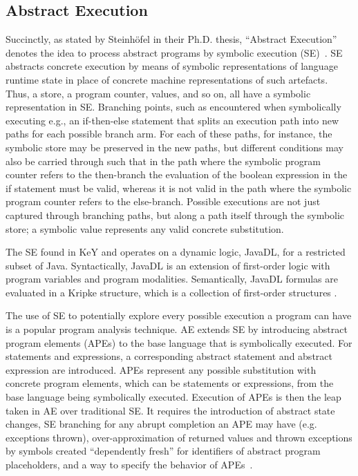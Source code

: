 \subsection{Abstract Execution}
Succinctly, as stated by Steinhöfel in their Ph.D. thesis, ``Abstract Execution'' denotes the idea to process abstract programs by symbolic execution (SE)~\cite{steinhoefel-20}.
SE~\cite{DBLP:journals/csur/BaldoniCDDF18,DBLP:journals/ac/YangFBCW19} abstracts concrete execution by means of symbolic representations of language runtime
state in place of concrete machine representations of such artefacts.
Thus, a store, a program counter, values, and so on, all have a symbolic representation in SE.
Branching points, such as encountered when symbolically executing e.g., an if-then-else statement that splits an execution path into new paths for each possible branch arm.
For each of these paths, for instance, the symbolic store may be preserved in the new paths, but different conditions may also be carried through such that in the path where the symbolic program counter refers
to the then-branch the evaluation of the boolean expression in the if statement must be valid, whereas it is not valid in the path where the symbolic program counter refers to the else-branch.
Possible executions are not just captured through branching paths, but along a path itself through the symbolic store; a symbolic value represents any valid concrete substitution.

The SE found in KeY and \Refinity{} operates on a dynamic logic, JavaDL, for a restricted subset of Java.
Syntactically, JavaDL is an extension of first-order logic with program variables and program modalities.
Semantically, JavaDL formulas are evaluated in a Kripke structure, which is a collection of first-order structures \cite[Sec.~3.3]{DBLP:series/lncs/10001}.

The use of SE to potentially explore every possible execution a program can have is a popular program analysis technique. AE extends SE by
introducing abstract program elements (APEs) to the base language that is symbolically executed.
For statements and expressions, a corresponding abstract statement and abstract expression are introduced.
APEs represent any possible substitution with concrete program elements, which can be statements or expressions, from the base language being symbolically executed.
Execution of APEs is then the leap taken in AE over traditional SE.  It requires the introduction of abstract state changes, SE branching for
any abrupt completion an APE may have (e.g. exceptions thrown),
over-approximation of returned values and thrown exceptions by symbols created ``dependently fresh'' for identifiers of abstract program placeholders, and a way to specify the behavior of APEs~\cite{steinhoefel-20}.

